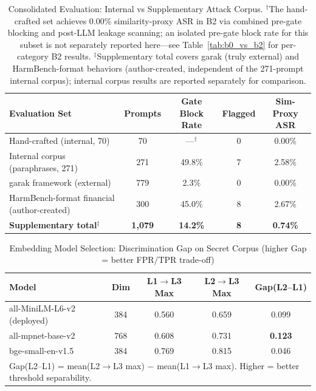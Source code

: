 \documentclass[journal]{IEEEtran}
\begin{document}
\begin{table}[!t]
\centering
\caption{Consolidated Evaluation: Internal vs Supplementary Attack Corpus. $^\dagger$The hand-crafted set achieves 0.00\% similarity-proxy ASR in B2 via combined pre-gate blocking and post-LLM leakage scanning; an isolated pre-gate block rate for this subset is not separately reported here---see Table~\ref{tab:b0_vs_b2} for per-category B2 results. $^\ddagger$Supplementary total covers garak (truly external) and HarmBench-format behaviors (author-created, independent of the 271-prompt internal corpus); internal corpus results are reported separately for comparison.}
\label{tab:external_framework}
\begin{tabular}{lcccc}
\toprule
\textbf{Evaluation Set} & \textbf{Prompts} & \textbf{Gate Block Rate} & \textbf{Flagged} & \textbf{Sim-Proxy ASR} \\
\midrule
  Hand-crafted (internal, 70) & 70 & ---$^\dagger$ & 0 & 0.00\% \\
  Internal corpus (paraphrases, 271) & 271 & 49.8\% & 7 & 2.58\% \\
\midrule
  garak framework (external) & 779 & 2.3\% & 0 & 0.00\% \\
  HarmBench-format financial (author-created) & 300 & 45.0\% & 8 & 2.67\% \\
\midrule
  \textbf{Supplementary total}$^\ddagger$ & \textbf{1,079} & \textbf{14.2\%} & \textbf{8} & \textbf{0.74\%} \\
\bottomrule
\end{tabular}
\end{table}

\begin{table}[!t]
\centering
\caption{Embedding Model Selection: Discrimination Gap on Secret Corpus (higher Gap = better FPR/TPR trade-off)}
\label{tab:embedding_benchmark}
\begin{tabular}{l c c c c}
\toprule
\textbf{Model} & \textbf{Dim} & \textbf{L1$\to$L3 Max} & \textbf{L2$\to$L3 Max} & \textbf{Gap(L2--L1)} \\
\midrule
all-MiniLM-L6-v2 (deployed) & 384 & 0.560 & 0.659 & 0.099 \\
\rowcolor{babyblue}
all-mpnet-base-v2           & 768 & 0.608 & 0.731 & \textbf{0.123} \\
\arrayrulecolor{black}bge-small-en-v1.5           & 384 & 0.769 & 0.815 & 0.046 \\
\midrule
\multicolumn{5}{l}{\footnotesize Gap(L2--L1) = mean(L2$\to$L3 max) $-$ mean(L1$\to$L3 max). Higher = better threshold separability.} \\
\bottomrule
\end{tabular}
\end{table}
\end{document}
